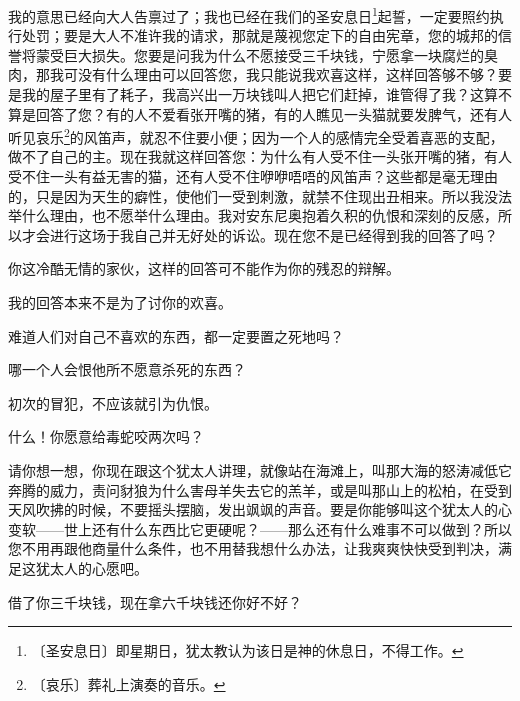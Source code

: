 \documentclass[12pt,UTF-8,openany]{ctexbook}
\begin{document}
\begin{large}
\begin{description}[itemsep=1ex,leftmargin=4.5em,labelwidth=4em]
    \item[{\color{script-1-3} 沙义洛}]我的意思已经向大人告禀过了；我也已经在我们的圣安息日\footnote{〔圣安息日〕即星期日，犹太教认为该日是神的休息日，不得工作。}起誓，一定要照约执行处罚；要是大人不准许我的请求，那就是蔑视您定下的自由宪章，您的城邦的信誉将蒙受巨大损失。您要是问我为什么不愿接受三千块钱，宁愿拿一块腐烂的臭肉，那我可没有什么理由可以回答您，我只能说我欢喜这样，这样回答够不够？要是我的屋子里有了耗子，我高兴出一万块钱叫人把它们赶掉，谁管得了我？这算不算是回答了您？有的人不爱看张开嘴的猪，有的人瞧见一头猫就要发脾气，还有人听见哀乐\footnote{〔哀乐〕葬礼上演奏的音乐。}的风笛声，就忍不住要小便；因为一个人的感情完全受着喜恶的支配，做不了自己的主。现在我就这样回答您：为什么有人受不住一头张开嘴的猪，有人受不住一头有益无害的猫，还有人受不住咿咿唔唔的风笛声？这些都是毫无理由的，只是因为天生的癖性，使他们一受到刺激，就禁不住现出丑相来。所以我没法举什么理由，也不愿举什么理由。我对安东尼奥抱着久积的仇恨和深刻的反感，所以才会进行这场于我自己并无好处的诉讼。现在您不是已经得到我的回答了吗？
    
    \item[{\color{script-1-4} 巴萨尼奥}]你这冷酷无情的家伙，这样的回答可不能作为你的残忍的辩解。
    
    \item[{\color{script-1-3} 沙义洛}]我的回答本来不是为了讨你的欢喜。
    
    \item[{\color{script-1-4} 巴萨尼奥}]难道人们对自己不喜欢的东西，都一定要置之死地吗？
    
    \item[{\color{script-1-3} 沙义洛}]哪一个人会恨他所不愿意杀死的东西？
    
    \item[{\color{script-1-4} 巴萨尼奥}]初次的冒犯，不应该就引为仇恨。
    
    \item[{\color{script-1-3} 沙义洛}]什么！你愿意给毒蛇咬两次吗？
    
    \item[{\color{script-1-1} 安东尼奥}]请你想一想，你现在跟这个犹太人讲理，就像站在海滩上，叫那大海的怒涛减低它奔腾的威力，责问豺狼为什么害母羊失去它的羔羊，或是叫那山上的松柏，在受到天风吹拂的时候，不要摇头摆脑，发出飒飒的声音。要是你能够叫这个犹太人的心变软——世上还有什么东西比它更硬呢？——那么还有什么难事不可以做到？所以您不用再跟他商量什么条件，也不用替我想什么办法，让我爽爽快快受到判决，满足这犹太人的心愿吧。
    
    \item[{\color{script-1-4} 巴萨尼奥}]借了你三千块钱，现在拿六千块钱还你好不好？
    

\end{description}
\end{large}
\end{document}
